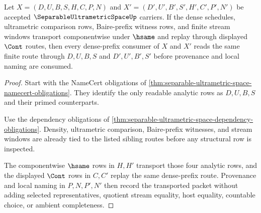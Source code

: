\begin{theorem}
\label{thm:separable-ultrametric-space-dense-prefix-transport}
Let $X=(D,U,B,S,H,C,P,N)$ and $X'=(D',U',B',S',H',C',P',N')$ be accepted $\SeparableUltrametricSpaceUp$ carriers. If the dense schedules, ultrametric comparison rows, Baire-prefix witness rows, and finite stream windows transport componentwise under $\hsame$ and replay through displayed $\Cont$ routes, then every dense-prefix consumer of $X$ and $X'$ reads the same finite route through $D,U,B,S$ and $D',U',B',S'$ before provenance and local naming are consumed.
\end{theorem}
\begin{proof}
Start with the NameCert obligations of \autoref{thm:separable-ultrametric-space-namecert-obligations}. They identify the only readable analytic rows as $D,U,B,S$ and their primed counterparts.

Use the dependency obligations of \autoref{thm:separable-ultrametric-space-dependency-obligations}. Density, ultrametric comparison, Baire-prefix witnesses, and stream windows are already tied to the listed sibling routes before any structural row is inspected.

The componentwise $\hsame$ rows in $H,H'$ transport those four analytic rows, and the displayed $\Cont$ rows in $C,C'$ replay the same dense-prefix route. Provenance and local naming in $P,N,P',N'$ then record the transported packet without adding selected representatives, quotient stream equality, host equality, countable choice, or ambient completeness.
\end{proof}




